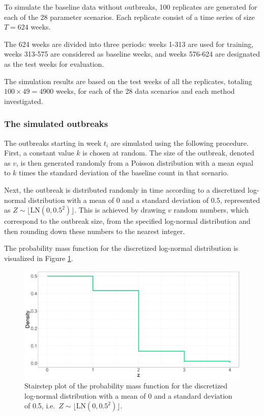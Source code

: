 \documentclass[preprint, 3p, authoryear]{elsarticle} %
\begin{document}
To simulate the baseline data without outbreaks, 100 replicates are generated for each of the 28 parameter scenarios. Each replicate consist of a time series of size \(T=624\) weeks.

The 624 weeks are divided into three periods: weeks 1-313 are used for training, weeks 313-575 are considered as baseline weeks, and weeks 576-624 are designated as the test weeks for evaluation.

The simulation results are based on the test weeks of all the replicates, totaling \(100\times 49=4900\) weeks, for each of the 28 data scenarios and each method investigated.

\hypertarget{the-simulated-outbreaks}{%
\subsubsection{The simulated outbreaks}\label{the-simulated-outbreaks}}

The outbreaks starting in week \(t_i\) are simulated using the following procedure. First, a constant value \(k\) is chosen at random. The size of the outbreak, denoted as \(v\), is then generated randomly from a Poisson distribution with a mean equal to \(k\) times the standard deviation of the baseline count in that scenario.

Next, the outbreak is distributed randomly in time according to a discretized log-normal distribution with a mean of \(0\) and a standard deviation of \(0.5\), represented as \(Z \sim \lfloor \mathrm{LN}(0,0.5^2)\rfloor\). This is achieved by drawing \(v\) random numbers, which correspond to the outbreak size, from the specified log-normal distribution and then rounding down these numbers to the nearest integer.

The probability mass function for the discretized log-normal distribution is visualized in Figure \ref{fig:PDFLogNormal}.



\begin{figure}[H]
\includegraphics[width=1\linewidth]{../../figures/PDFLogNormal} \caption{Stairstep plot of the probability mass function for the discretized log-normal distribution with a mean of 0 and a standard deviation of 0.5, i.e.~\(Z \sim \lfloor \mathrm{LN}(0,0.5^2)\rfloor\).}\label{fig:PDFLogNormal}
\end{figure}
\end{document}
